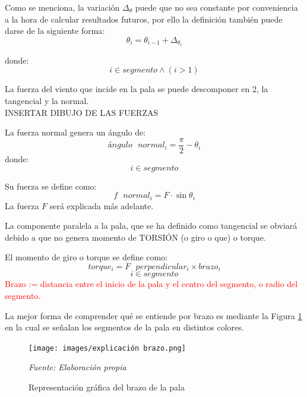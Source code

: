 \begin{definicion}
Como se menciona, la variación $\Delta_\theta$ puede que no sea constante por conveniencia a la hora de calcular resultados futuros, por ello la definición también puede darse de la siguiente forma:
$$\theta_i = \theta_{i-1} + \Delta_{\theta_{i}}$$ 

    donde:
 $$i \in segmento \wedge (i > 1)$$
\label{def:theta_nocte}
\end{definicion}


La fuerza del viento que incide en la pala se puede descomponer en 2, la tangencial y la normal. \\

 INSERTAR DIBUJO DE LAS FUERZAS \\
 
 \begin{definicion}
 La fuerza normal genera un ángulo de:
 $$ ángulo \text{ } normal_i = \dfrac{\pi}{2} - \theta_i $$
 donde:
 $$ i \in segmento$$
 \end{definicion}

 \begin{definicion}
  Su fuerza se define como:
  $$ f \text{ } normal_i = F \cdot \sin{\theta_i}$$
   La fuerza $F$ será explicada más adelante.
  \label{def:fuerza_normal}
 \end{definicion}

 
 La componente paralela a la pala, que se ha definido como tangencial se obviará debido a que no genera momento de TORSIÓN (o giro o que) o torque. 
 
 \begin{definicion}
El momento de giro o torque se define como:
 $$ torque_i = F \text{ } perpendicular_i \times brazo_i$$
 $$ i \in segmento$$
 \label{def:torque} %
 \textcolor{red}{Brazo := distancia entre el inicio de la pala y el centro del segmento, o radio del segmento.} \\
 \end{definicion}

 La mejor forma de comprender qué se entiende por brazo es mediante la Figura \ref{fig:exp_brazo} en la cual se señalan los segmentos de la pala en distintos colores.
 
     \textbf{}
    \begin{figure}[H]
    \centering
    \texttt{[image: images/explicación brazo.png]}
    \caption{Representación gráfica del brazo de la pala}
    \label{fig:exp_brazo}
    \textit{Fuente: Elaboración propia}
\end{figure}

